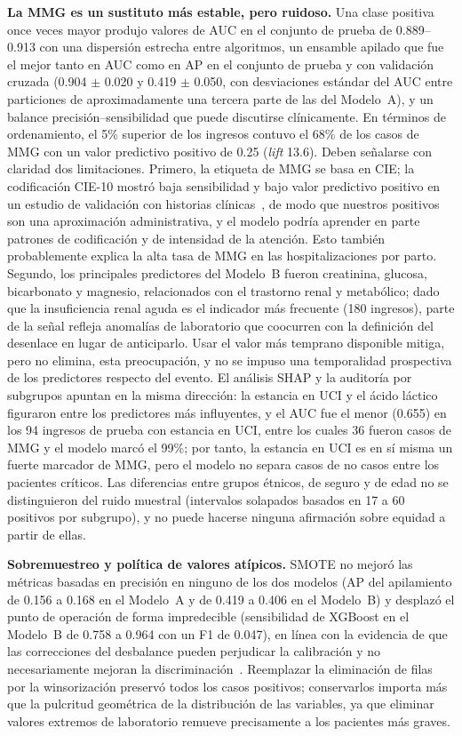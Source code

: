 \documentclass[healthcare,article,submit,pdftex,moreauthors]{Definitions/mdpi_es}
\begin{document}
\textbf{La MMG es un sustituto más estable, pero ruidoso.} Una clase positiva once
veces mayor produjo valores de AUC en el conjunto de prueba de 0.889--0.913 con una dispersión estrecha entre
algoritmos, un ensamble apilado que fue el mejor tanto en AUC como en AP en el conjunto de prueba y con validación cruzada
(0.904 $\pm$ 0.020 y 0.419 $\pm$ 0.050, con desviaciones estándar del AUC entre particiones de aproximadamente una
tercera parte de las del Modelo~A), y un balance precisión--sensibilidad que puede discutirse clínicamente.
En términos de ordenamiento, el 5\% superior de los ingresos contuvo el 68\% de los casos de MMG con un valor predictivo positivo de 0.25
(\emph{lift} 13.6). Deben señalarse con claridad dos limitaciones.
Primero, la etiqueta de MMG se basa en CIE; la codificación CIE-10 mostró
baja sensibilidad y bajo valor predictivo positivo en un estudio de validación con
historias clínicas~\cite{Boulet2024ICD10SMM}, de modo que nuestros positivos son una aproximación administrativa, y
el modelo podría aprender en parte patrones de codificación y de intensidad de la atención. Esto también
probablemente explica la alta tasa de MMG en las hospitalizaciones por parto. Segundo, los principales
predictores del Modelo~B fueron creatinina, glucosa, bicarbonato y magnesio,
relacionados con el trastorno renal y metabólico; dado que la insuficiencia renal aguda es el
indicador más frecuente (180 ingresos), parte de la señal refleja
anomalías de laboratorio que coocurren con la definición del desenlace en lugar de
anticiparlo. Usar el valor más temprano disponible mitiga, pero no elimina, esta
preocupación, y no se impuso una temporalidad prospectiva de los predictores respecto del evento. El análisis SHAP y la auditoría por subgrupos apuntan en la misma dirección: la estancia en UCI y el ácido láctico
figuraron entre los predictores más influyentes, y el AUC fue el menor (0.655) en los 94 ingresos de prueba con estancia en UCI, entre los cuales
36 fueron casos de MMG y el modelo marcó el 99\%; por tanto, la estancia en UCI es en sí misma un fuerte marcador de MMG, pero el modelo no
separa casos de no casos entre los pacientes críticos. Las diferencias entre grupos étnicos, de seguro y de edad no se distinguieron del ruido muestral
(intervalos solapados basados en 17 a 60 positivos por subgrupo), y no puede hacerse ninguna afirmación sobre equidad a partir de ellas.

\textbf{Sobremuestreo y política de valores atípicos.} SMOTE no mejoró las métricas basadas
en precisión en ninguno de los dos modelos (AP del apilamiento de 0.156 a 0.168 en el Modelo~A y de 0.419 a 0.406 en el Modelo~B) y desplazó el
punto de operación de forma impredecible (sensibilidad de XGBoost en el Modelo~B de 0.758 a 0.964 con un F1 de 0.047), en línea con la evidencia de que las correcciones del desbalance pueden perjudicar la calibración
y no necesariamente mejoran la discriminación~\cite{vandenGoorbergh2022Harm}.
Reemplazar la eliminación de filas por la winsorización preservó todos los casos positivos;
conservarlos importa más que la pulcritud geométrica de la distribución de las variables,
ya que eliminar valores extremos de laboratorio remueve precisamente a los
pacientes más graves.
\end{document}

